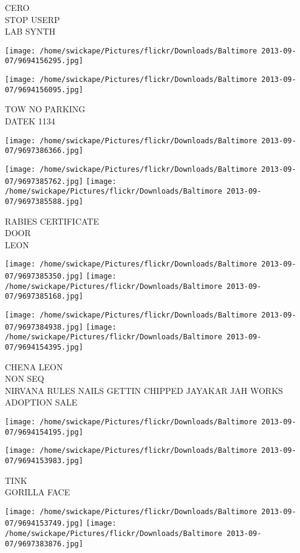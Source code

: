 \documentclass[10pt,letterpaper]{article}
\begin{document}
CERO\\
STOP USERP\\
LAB SYNTH
\pagebreak

\texttt{[image: /home/swickape/Pictures/flickr/Downloads/Baltimore 2013-09-07/9694156295.jpg]}

\vspace{0.25in}
\texttt{[image: /home/swickape/Pictures/flickr/Downloads/Baltimore 2013-09-07/9694156095.jpg]}

TOW NO PARKING\\
DATEK 1134
\pagebreak

\texttt{[image: /home/swickape/Pictures/flickr/Downloads/Baltimore 2013-09-07/9697386366.jpg]}

\vspace{0.25in}
\texttt{[image: /home/swickape/Pictures/flickr/Downloads/Baltimore 2013-09-07/9697385762.jpg]}
\texttt{[image: /home/swickape/Pictures/flickr/Downloads/Baltimore 2013-09-07/9697385588.jpg]}

RABIES CERTIFICATE\\
DOOR\\
LEON
\pagebreak

\texttt{[image: /home/swickape/Pictures/flickr/Downloads/Baltimore 2013-09-07/9697385350.jpg]}
\texttt{[image: /home/swickape/Pictures/flickr/Downloads/Baltimore 2013-09-07/9697385168.jpg]}

\texttt{[image: /home/swickape/Pictures/flickr/Downloads/Baltimore 2013-09-07/9697384938.jpg]}
\texttt{[image: /home/swickape/Pictures/flickr/Downloads/Baltimore 2013-09-07/9694154395.jpg]}

CHENA LEON\\
NON SEQ\\
NIRVANA RULES NAILS GETTIN CHIPPED JAYAKAR JAH WORKS\\
ADOPTION SALE
\pagebreak

\texttt{[image: /home/swickape/Pictures/flickr/Downloads/Baltimore 2013-09-07/9694154195.jpg]}

\vspace{0.25in}
\texttt{[image: /home/swickape/Pictures/flickr/Downloads/Baltimore 2013-09-07/9694153983.jpg]}

TINK\\
GORILLA FACE
\pagebreak

\texttt{[image: /home/swickape/Pictures/flickr/Downloads/Baltimore 2013-09-07/9694153749.jpg]}
\texttt{[image: /home/swickape/Pictures/flickr/Downloads/Baltimore 2013-09-07/9697383876.jpg]}
\end{document}
